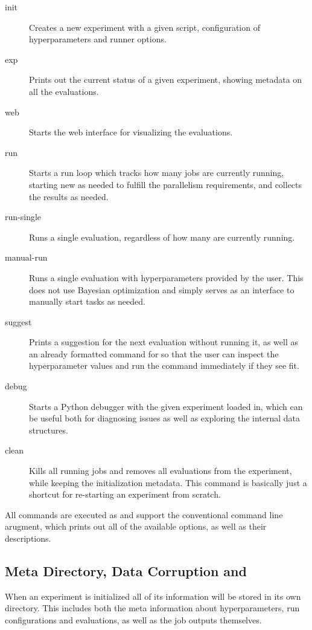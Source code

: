 \begin{description}
    \item[init] Creates a new experiment with a given script, configuration of hyperparameters and runner options.
    \item[exp] Prints out the current status of a given experiment, showing metadata on all the evaluations.
    \item[web] Starts the web interface for visualizing the evaluations.
    \item[run] Starts a run loop which tracks how many jobs are currently running, starting new as needed to fulfill the parallelism requirements, and collects the results as needed.
    \item[run-single] Runs a single evaluation, regardless of how many are currently running.
    \item[manual-run] Runs a single evaluation with hyperparameters provided by the user. This does not use Bayesian optimization and simply serves as an interface to manually start tasks as needed.
    \item[suggest] Prints a suggestion for the next evaluation without running it, as well as an already formatted command for  so that the user can inspect the hyperparameter values and run the command immediately if they see fit.
    \item[debug] Starts a Python debugger with the given experiment loaded in, which can be useful both for diagnosing issues as well as exploring the internal data structures.
    \item[clean] Kills all running jobs and removes all evaluations from the experiment, while keeping the initialization metadata. This command is basically just a shortcut for re-starting an experiment from scratch.
\end{description}

All commands are executed as  and support the conventional  command line arugment, which prints out all of the available options, as well as their descriptions.

\subsection{Meta Directory, Data Corruption and }
\label{section:meta-dir}

When an experiment is initialized all of its information will be stored in its own directory. This includes both the meta information about hyperparameters, run configurations and evaluations, as well as the job outputs themselves.

